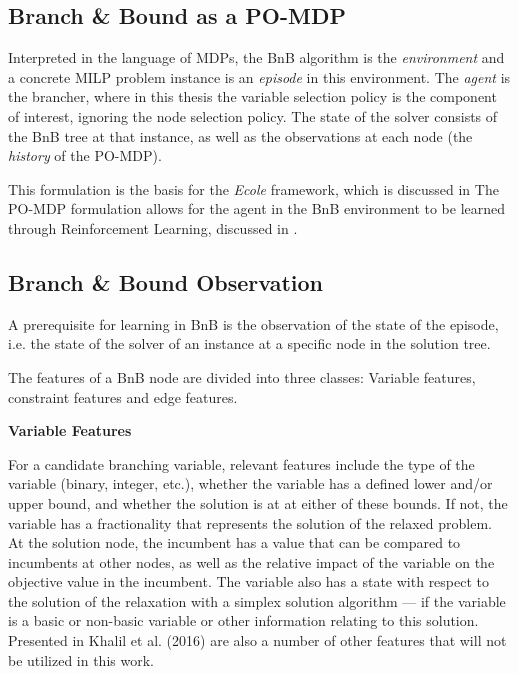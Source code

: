 \subsection{Branch \& Bound as a PO-MDP}\label{ssec:pomdp}

Interpreted in the language of \gls{MDP}s, the \gls{BnB} algorithm is the \textit{environment} and a concrete \gls{MILP} problem instance is an \textit{episode} in this environment. The \textit{agent} is the brancher, where in this thesis the variable selection policy is the component of interest, ignoring the node selection policy. The state of the solver consists of the \gls{BnB} tree at that instance, as well as the observations at each node (the \textit{history} of the \gls{PO-MDP}).

This formulation is the basis for the \textit{Ecole} framework, which is discussed in 
The \gls{PO-MDP} formulation allows for the agent in the \gls{BnB} environment to be learned through Reinforcement Learning, discussed in .



\subsection{Branch \& Bound Observation}\label{ssec:obs}

A prerequisite for learning in \gls{BnB} is the observation of the state of the episode, i.e. the state of the solver of an instance at a specific node in the solution tree. 


The features of a \gls{BnB} node are divided into three classes: Variable features, constraint features and edge features.


\textbf{Variable Features}

For a candidate branching variable, relevant features include the type of the variable (binary, integer, etc.), whether the variable has a defined lower and/or upper bound, and whether the solution is at at either of these bounds.  
If not, the variable has a fractionality that represents the solution of the relaxed problem.
At the solution node, the incumbent has a value that can be compared to incumbents at other nodes, as well as the relative impact of the variable on the objective value in the incumbent. 
The variable also has a state with respect to the solution of the relaxation with a simplex solution algorithm --- if the variable is a basic or non-basic variable or other information relating to this solution.
Presented in Khalil et al. (2016) \cite{khalil2016learning} are also a number of other features that will not be utilized in this work.





